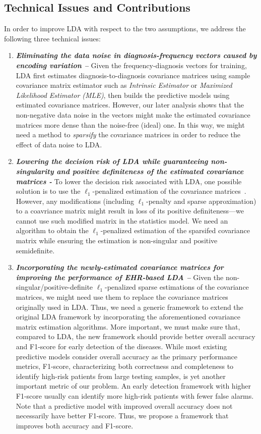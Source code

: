 \subsection{Technical Issues and Contributions} 
In order to improve LDA with respect to the two assumptions, we address the following three technical issues:
%
\begin{enumerate}
\item \textbf{\em Eliminating the data noise in diagnosis-frequency vectors caused by encoding variation -- } Given the frequency-diagnosis vectors for training, LDA first estimates diagnosis-to-diagnosis covariance matrices using sample covariance matrix estimator such as \emph{Intrinsic Estimator} or \emph{Maximized Likelihood Estimator (MLE)}, then builds the predictive models using estimated covariance matrices.
However, our later analysis shows that the non-negative data noise in the vectors might make the estimated covariance matrices more dense than the noise-free (ideal) one.
In this way, we might need a method to \emph{sparsify} the covariance matrices in order to reduce the effect of data noise to LDA.
 

\item \textbf{\em Lowering the decision risk of LDA while guaranteeing non-singularity and positive definiteness of the estimated covariance matrices - } To lower the decision risk associated with LDA, one possible solution is to use the $\ell_1$-penalized estimation of the covariance matrices~\cite{cai2012minimax,xue2012positive}.
However, any modifications (including $\ell_1$-penalty and sparse approximation) to a coavriance matrix might result in loss of its positive definiteness---we cannot use such modified matrix in the statistics model.
We need an algorithm to obtain the $\ell_1$-penalized estimation of the sparsifed covariance matrix while ensuring the estimation is non-singular and positive semidefinite.


\item \textbf{ \em Incorporating the newly-estimated covariance matrices for improving the performance of EHR-based LDA -- } Given the non-singular/positive-definite $\ell_1$-penalized sparse estimations of the  covariance matrices, we might need use them to replace the covariance matrices originally used in LDA.
Thus, we need a generic framework to extend the original LDA framework by incorporating the aforementioned covariance matrix estimation algorithms.
More important, we must make sure that, compared to LDA, the new framework should provide better overall accuracy and F1-score for early detection of the diseases.
While most existing predictive models consider overall accuracy as the primary performance metrics, F1-score, characterizing both correctness and completeness to identify high-risk patients from large testing samples, is yet another important metric of our problem.
An early detection framework with higher F1-score usually can identify more high-risk patients with fewer false alarms.
Note that a predictive model with improved overall accuracy does not necessarily have better F1-score.
Thus, we propose a framework that improves both accuracy and F1-score.


\end{enumerate}
